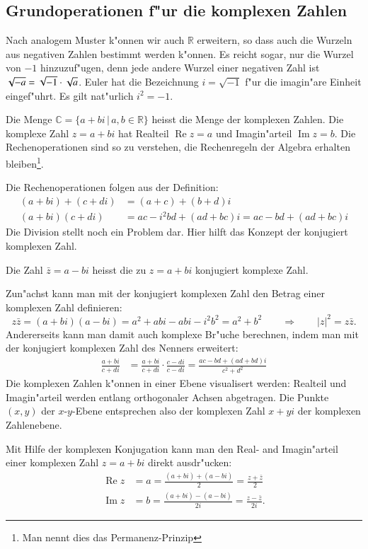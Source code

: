 \subsection{Grundoperationen f"ur die komplexen Zahlen}
Nach analogem Muster k"onnen wir auch $\mathbb R$ erweitern, so dass auch
die Wurzeln aus negativen Zahlen bestimmt werden k"onnen. Es reicht
sogar, nur die Wurzel von $-1$ hinzuzuf"ugen, denn jede andere Wurzel
einer negativen Zahl ist $\sqrt{-a}=\sqrt{-1}\cdot\sqrt{\mathstrut a}$.
Euler hat die Bezeichnung $i=\sqrt{-1}$ f"ur die imagin"are Einheit eingef"uhrt.
Es gilt nat"urlich $i^2=-1$.

\begin{definition}
Die Menge $\mathbb C=\{a+bi\,|\,a,b\in\mathbb R\}$ heisst die Menge der
komplexen Zahlen. Die komplexe Zahl $z=a+bi$ hat
Realteil $\operatorname{Re}z=a$ und Imagin"arteil $\operatorname{Im}z=b$.
Die Rechenoperationen sind so zu verstehen, die Rechenregeln
der Algebra erhalten bleiben\footnote{Man nennt dies das Permanenz-Prinzip}.
\end{definition}

Die Rechenoperationen folgen aus der Definition:
\begin{align*}
(a+bi)+(c+di)&=(a+c)+(b+d)i\\
(a+bi)(c+di)&=ac-i^2bd+(ad+bc)i=ac-bd+(ad+bc)i
\end{align*}
Die Division stellt noch ein Problem dar. Hier hilft das Konzept der
konjugiert komplexen Zahl.

\begin{definition}
Die Zahl $\bar z=a-bi$ heisst die zu $z=a+bi$ konjugiert komplexe Zahl.
\end{definition}

Zun"achst kann man mit der konjugiert komplexen Zahl den Betrag einer
komplexen Zahl definieren:
\[
z\bar z=(a+bi)(a-bi)=a^2+abi-abi-i^2b^2=a^2+b^2\qquad\Rightarrow\qquad
|z|^2=z\bar z.
\]
Andererseits kann man damit auch komplexe Br"uche berechnen, indem man
mit der konjugiert komplexen Zahl des Nenners erweitert:
\begin{align*}
\frac{a+bi}{c+di}&=
\frac{a+bi}{c+di}
\cdot
\frac{c-di}{c-di}=\frac{ac-bd+(ad+bd)i}{c^2+d^2}
\end{align*}
Die komplexen Zahlen k"onnen in einer Ebene visualisert werden: 
Realteil und Imagin"arteil werden entlang orthogonaler Achsen abgetragen.
Die Punkte $(x,y)$ der $x$-$y$-Ebene entsprechen also der komplexen Zahl
$x+yi$ der komplexen Zahlenebene.

Mit Hilfe der komplexen Konjugation kann man den Real- and Imagin"arteil
einer komplexen Zahl $z=a+bi$ direkt ausdr"ucken:
\begin{align}
\operatorname{Re}z 
&=
a=\frac{(a+bi)+(a-bi)}2=\frac{z+\bar z}2
\label{skript:realteil-formel}
\\
\operatorname{Im}z
&=
b=\frac{(a+bi)-(a-bi)}{2i}=\frac{z-\bar z}{2i}.
\label{skript:imaginaerteil-formel}
\end{align}

